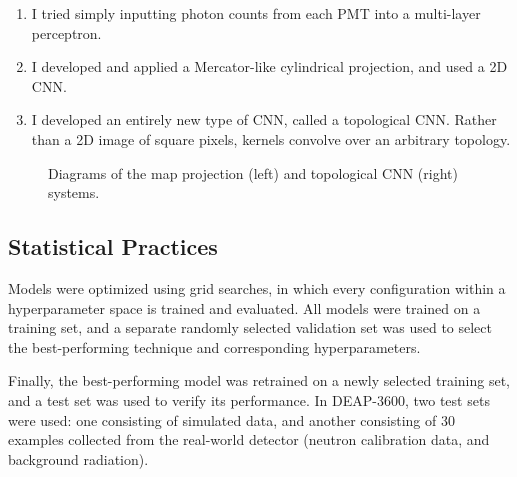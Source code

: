 \documentclass[12pt]{article}
\begin{document}
\begin{enumerate}
    \item I tried simply inputting photon counts from each PMT into a multi-layer perceptron.
    \item I developed and applied a Mercator-like cylindrical projection, and used a 2D CNN.
    \item I developed an entirely new type of CNN, called a topological CNN. Rather than a 2D image of square pixels, kernels convolve over an arbitrary topology.
\end{enumerate}

\begin{figure}[ht]
    \centering
    \qquad
    \caption{Diagrams of the map projection (left) and topological CNN (right) systems.}
\end{figure}

\subsection{Statistical Practices}

Models were optimized using grid searches, in which every configuration within a hyperparameter space is trained and evaluated. All models were trained on a training set, and a separate randomly selected validation set was used to select the best-performing technique and corresponding hyperparameters.

Finally, the best-performing model was retrained on a newly selected training set, and a test set was used to verify its performance. In DEAP-3600, two test sets were used: one consisting of simulated data, and another consisting of 30 examples collected from the real-world detector (neutron calibration data, and background radiation).
\end{document}
